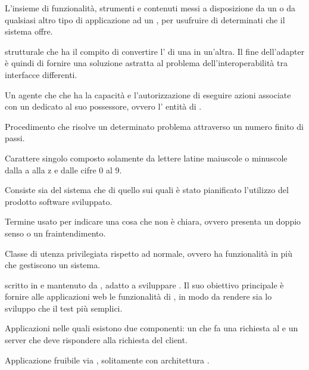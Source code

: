 \Inizio{}




{L'insieme di funzionalità, strumenti e contenuti messi a disposizione da un  o da qualsiasi altro tipo di applicazione ad un , per usufruire di determinati  che il sistema offre.}

{ strutturale che ha il compito di convertire l' di una  in un'altra.
Il fine dell'adapter è quindi di fornire una soluzione astratta al problema dell'interoperabilità tra interfacce differenti.}

{Un agente che che ha la capacità e l'autorizzazione di eseguire azioni associate con un  dedicato al suo possessore, ovvero l' entità di .}

{Procedimento che risolve un determinato problema attraverso un numero finito di passi.} 

{Carattere singolo composto solamente da lettere latine maiuscole o minuscole dalla a alla z e dalle cifre  0 al 9.}

{Consiste sia del sistema  che di quello  sui quali è stato pianificato l'utilizzo del prodotto software sviluppato.}

{Termine usato per indicare una cosa che non è chiara, ovvero presenta un doppio senso o un fraintendimento.}

{Classe di utenza privilegiata rispetto ad  normale, ovvero ha funzionalità in più che gestiscono un sistema.}

{  scritto in  e mantenuto da , adatto a sviluppare . Il suo obiettivo principale è fornire alle applicazioni web le funzionalità di , in modo da rendere sia lo sviluppo che il test più semplici.}

{Applicazioni nelle quali esistono due componenti: un  che fa una richiesta al  e un server che deve rispondere alla richiesta del client.}

{Applicazione fruibile via , solitamente con architettura .}

